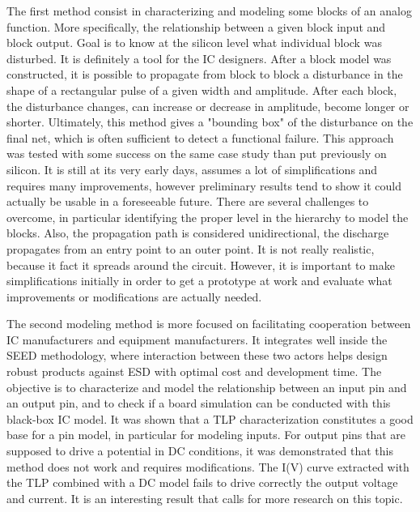The first method consist in characterizing and modeling some blocks of an analog function.
More specifically, the relationship between a given block input and block output.
Goal is to know at the silicon level what individual block was disturbed.
It is definitely a tool for the IC designers.
After a block model was constructed, it is possible to propagate from block to block a disturbance in the shape of a rectangular pulse of a given width and amplitude.
After each block, the disturbance changes, can increase or decrease in amplitude, become longer or shorter.
Ultimately, this method gives a "bounding box" of the disturbance on the final net, which is often sufficient to detect a functional failure.
This approach was tested with some success on the same case study than put previously on silicon.
It is still at its very early days, assumes a lot of simplifications and requires many improvements, however preliminary results tend to show it could actually be usable in a foreseeable future.
There are several challenges to overcome, in particular identifying the proper level in the hierarchy to model the blocks.
Also, the propagation path is considered unidirectional, the discharge propagates from an entry point to an outer point.
It is not really realistic, because it fact it spreads around the circuit.
However, it is important to make simplifications initially in order to get a prototype at work and evaluate what improvements or modifications are actually needed.

The second modeling method is more focused on facilitating cooperation between IC manufacturers and equipment manufacturers.
It integrates well inside the SEED methodology, where interaction between these two actors helps design robust products against ESD with optimal cost and development time.
The objective is to characterize and model the relationship between an input pin and an output pin, and to check if a board simulation can be conducted with this black-box IC model.
It was shown that a TLP characterization constitutes a good base for a pin model, in particular for modeling inputs.
For output pins that are supposed to drive a potential in DC conditions, it was demonstrated that this method does not work and requires modifications.
The I(V) curve extracted with the TLP combined with a DC model fails to drive correctly the output voltage and current.
It is an interesting result that calls for more research on this topic.


